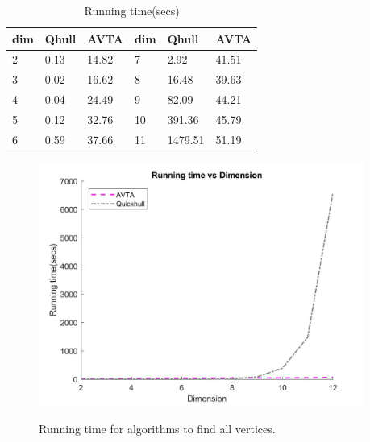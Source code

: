 \documentclass[]{article}
\begin{document}
	\begin{table}[!h]
		\centering
		\caption{Running time(secs)}
		\label{tb:avtaqhull}
		\scalebox{0.5}
		{
		\begin{tabular}{|l|l|l|l|l|l|}
			\hline
			dim & Qhull & AVTA  & dim & Qhull & AVTA  \\ \hline
			2   & 0.13      & 14.82 & 7   & 2.92      & 41.51 \\ \hline
			3   & 0.02      & 16.62 & 8   & 16.48     & 39.63 \\ \hline
			4   & 0.04      & 24.49 & 9   & 82.09     & 44.21 \\ \hline
			5   & 0.12      & 32.76 & 10  & 391.36    & 45.79 \\ \hline
			6   & 0.59      & 37.66 & 11  & 1479.51   & 51.19 \\ \hline
		\end{tabular}
	}
	\end{table}
		
	\begin{figure}[!h]
		\centering
		\scalebox{0.5}
		{
			\begin{minipage}[b]{0.95\linewidth}
				\centering
				\includegraphics[width=0.95\textwidth]{tavsqhull.jpg}
				\label{fig1}
			\end{minipage}%
		}
		\caption{Running time for algorithms to find all vertices.}
		\label{fig1}
	\end{figure}
	
\end{document}
